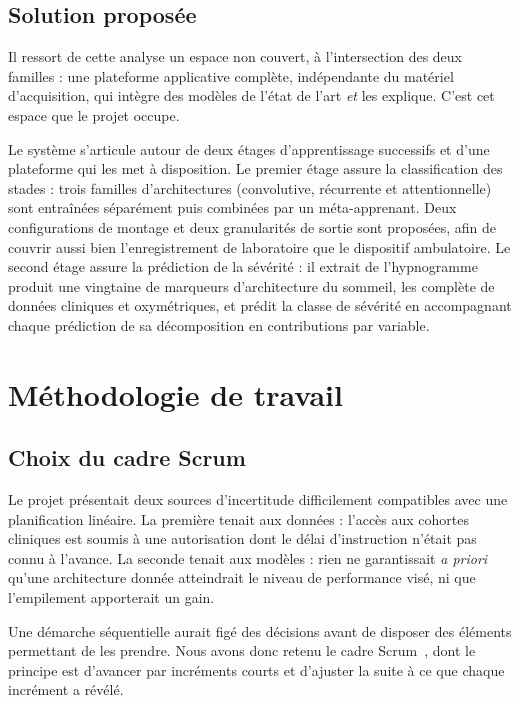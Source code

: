 \subsection{Solution proposée}

Il ressort de cette analyse un espace non couvert, à l'intersection des deux familles :
une plateforme applicative complète, indépendante du matériel d'acquisition, qui intègre
des modèles de l'état de l'art \emph{et} les explique. C'est cet espace que le projet
occupe.

Le système s'articule autour de deux étages d'apprentissage successifs et d'une
plateforme qui les met à disposition. Le premier étage assure la classification
des stades : trois familles d'architectures (convolutive, récurrente et
attentionnelle) sont entraînées séparément puis combinées par un méta-apprenant. Deux
configurations de montage et deux granularités de sortie sont proposées, afin de couvrir
aussi bien l'enregistrement de laboratoire que le dispositif ambulatoire. Le second
étage assure la prédiction de la sévérité : il extrait de l'hypnogramme
produit une vingtaine de marqueurs d'architecture du sommeil, les complète de données
cliniques et oxymétriques, et prédit la classe de sévérité en accompagnant chaque
prédiction de sa décomposition en contributions par variable.

\section{Méthodologie de travail}

\subsection{Choix du cadre Scrum}

Le projet présentait deux sources d'incertitude difficilement compatibles avec une
planification linéaire. La première tenait aux données : l'accès aux cohortes cliniques
est soumis à une autorisation dont le délai d'instruction n'était pas connu à l'avance.
La seconde tenait aux modèles : rien ne garantissait \emph{a priori} qu'une
architecture donnée atteindrait le niveau de performance visé, ni que l'empilement
apporterait un gain.

Une démarche séquentielle aurait figé des décisions avant de disposer des éléments
permettant de les prendre. Nous avons donc retenu le cadre Scrum~\cite{schwaber2020},
dont le principe est d'avancer par incréments courts et d'ajuster la suite à ce que
chaque incrément a révélé.


